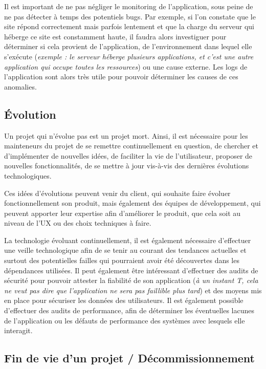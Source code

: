 Il est important de ne pas négliger le monitoring de l'application, sous peine de ne pas détecter à temps des potentiels bugs. Par exemple, si l'on constate que le site répond correctement mais parfois lentement et que la charge du serveur qui héberge ce site est constamment haute, il faudra alors investiguer pour déterminer si cela provient de l'application, de l'environnement dans lequel elle s'exécute (\emph{exemple : le serveur héberge plusieurs applications, et c'est une autre application qui occupe toutes les ressources}) ou une cause externe. Les logs de l'application sont alors très utile pour pouvoir déterminer les causes de ces anomalies.

\subsection{Évolution}

Un projet qui n'évolue pas est un projet mort. Ainsi, il est nécessaire pour les mainteneurs du projet de se remettre continuellement en question, de chercher et d'implémenter de nouvelles idées, de faciliter la vie de l'utilisateur, proposer de nouvelles fonctionnalités, de se mettre à jour vis-à-vis des dernières évolutions technologiques. 

Ces idées d'évolutions peuvent venir du client, qui souhaite faire évoluer fonctionnellement son produit, mais également des équipes de développement, qui peuvent apporter leur expertise afin d'améliorer le produit, que cela soit au niveau de l'\gls{UX} ou des choix techniques à faire.

La technologie évoluant continuellement, il est également nécessaire d'effectuer une veille technologique afin de se tenir au courant des tendances actuelles et surtout des potentielles failles qui pourraient avoir été découvertes dans les dépendances utilisées. Il peut également être intéressant d'effectuer des audits de sécurité pour pouvoir attester la fiabilité de son application (\emph{à un instant T, cela ne veut pas dire que l'application ne sera pas faillible plus tard}) et des moyens mis en place pour sécuriser les données des utilisateurs. Il est également possible d'effectuer des audits de performance, afin de déterminer les éventuelles lacunes de l'application ou les défauts de performance des systèmes avec lesquels elle interagit.

\subsection{Fin de vie d'un projet / Décommissionnement}

